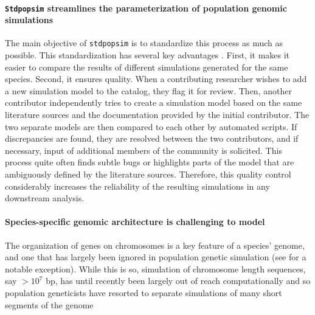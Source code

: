 \documentclass[hidelinks]{article}
\newcommand{\Stdpopsim}{\texttt{Stdpopsim}\xspace}
\newcommand{\stdpopsim}{\texttt{stdpopsim}\xspace}
\begin{document}
\paragraph*{\Stdpopsim streamlines the parameterization of population genomic simulations}
The main objective of \stdpopsim is to standardize this process as much as possible.
This standardization has several key advantages \citep{Adrion2020}. First, it makes it easier to compare the results of different
simulations generated for the same species. 
Second, it ensures quality.
When a contributing researcher wishes to add a new simulation model to the catalog,
they flag it for review. Then, another contributor independently tries to create a simulation model based on the same literature sources and the documentation provided by the initial contributor. The two separate models are then
compared to each other by automated scripts. If discrepancies are found, they
are resolved between the two contributors, and if necessary, input of additional members of the community is solicited. This process quite often
finds subtle bugs  \citep{Ragsdale2020} or highlights parts of the model that are
ambiguously defined by the literature sources.
Therefore, this quality control considerably increases the reliability of the
resulting simulations in any downstream analysis.


\paragraph*{%
  \textbf{Species-specific genomic architecture is challenging to model}}
The organization of genes on chromosomes is a key feature of a species' genome,
and one that has largely been ignored in population genetic simulation (see \cite{schrider2020background} for a notable exception).
While this is so, simulation of chromosome length sequences, say $ > 10^7$ bp,
has until recently been largely out of reach computationally
and so population geneticists have resorted to separate simulations of many short segments
of the genome
\end{document}
